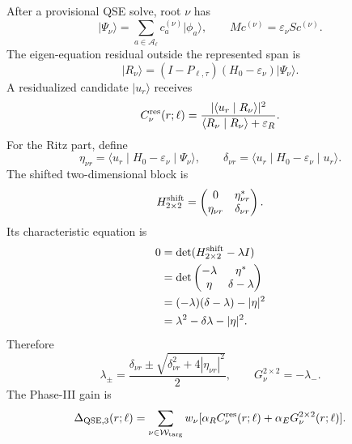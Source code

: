 \documentclass[10pt,twocolumn]{article}
\newcommand{\Acal}{\mathcal A}
\newcommand{\Wcal}{\mathcal W}
\newcommand{\qse}{\mathrm{QSE}}
\newcommand{\eps}{\varepsilon}
\newcommand{\ket}[1]{\lvert #1\rangle}
\newcommand{\braket}[2]{\langle #1\mid #2\rangle}
\newcommand{\matel}[3]{\langle #1\mid #2\mid #3\rangle}
\begin{document}
After a provisional QSE solve, root \(\nu\) has
\begin{equation}
\ket{\Psi_\nu}=\sum_{a\in\Acal_\ell}c_a^{(\nu)}\ket{\phi_a},
\qquad
M c^{(\nu)}=\varepsilon_\nu S c^{(\nu)}.
\label{eq:current_root}
\end{equation}
The eigen-equation residual outside the represented span is
\begin{equation}
\ket{R_\nu}=(I-P_{\ell,\tau})(H_0-\varepsilon_\nu)\ket{\Psi_\nu}.
\label{eq:residual}
\end{equation}
A residualized candidate \(\ket{u_r}\) receives
\begin{equation}
C_\nu^{\rm res}(r;\ell)=
\frac{|\braket{u_r}{R_\nu}|^2}{\braket{R_\nu}{R_\nu}+\eps_R}.
\label{eq:Cres}
\end{equation}
For the Ritz part, define
\begin{equation}
\eta_{\nu r}=\matel{u_r}{H_0-\varepsilon_\nu}{\Psi_\nu},
\qquad
\delta_{\nu r}=\matel{u_r}{H_0-\varepsilon_\nu}{u_r}.
\label{eq:eta_delta}
\end{equation}
The shifted two-dimensional block is
\begin{equation}
H_{2\times2}^{\rm shift}=
\begin{pmatrix}0&\eta_{\nu r}^*\\\eta_{\nu r}&\delta_{\nu r}\end{pmatrix}.
\label{eq:block_two}
\end{equation}
Its characteristic equation is
\begin{equation}
\begin{aligned}
0&=\det(H_{2\times2}^{\rm shift}-\lambda I)\\
&=\det\begin{pmatrix}-\lambda&\eta^*\\\eta&\delta-\lambda\end{pmatrix}\\
&=(-\lambda)(\delta-\lambda)-|\eta|^2\\
&=\lambda^2-\delta\lambda-|\eta|^2.
\end{aligned}
\label{eq:char_derivation}
\end{equation}
Therefore
\begin{equation}
\lambda_\pm=\frac{\delta_{\nu r}\pm
\sqrt{\delta_{\nu r}^2+4|\eta_{\nu r}|^2}}{2},
\qquad
G_\nu^{2\times2}=-\lambda_-.
\label{eq:G2}
\end{equation}
The Phase-III gain is
\begin{equation}
\Delta_{\qse,3}(r;\ell)=
\sum_{\nu\in\Wcal_{\rm targ}}w_\nu
[\alpha_R C_\nu^{\rm res}(r;\ell)+\alpha_EG_\nu^{2\times2}(r;\ell)].
\label{eq:D3}
\end{equation}
\end{document}
